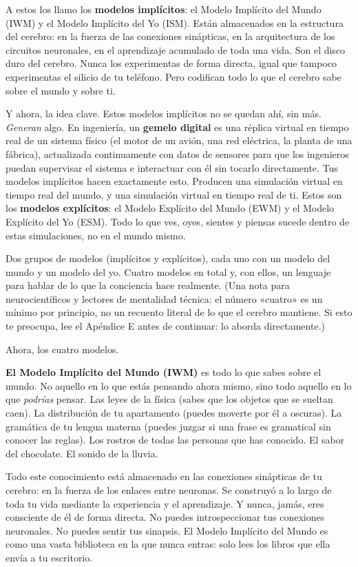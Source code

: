 \documentclass[11pt, twoside, openright]{book}
\begin{document}
A estos los llamo los \textbf{modelos implícitos}: el Modelo Implícito del Mundo (IWM) y el Modelo Implícito del Yo (ISM). Están almacenados en la estructura del cerebro: en la fuerza de las conexiones sinápticas, en la arquitectura de los circuitos neuronales, en el aprendizaje acumulado de toda una vida. Son el disco duro del cerebro. Nunca los experimentas de forma directa, igual que tampoco experimentas el silicio de tu teléfono. Pero codifican todo lo que el cerebro sabe sobre el mundo y sobre ti.

Y ahora, la idea clave. Estos modelos implícitos no se quedan ahí, sin más. \textit{Generan} algo. En ingeniería, un \textbf{gemelo digital} es una réplica virtual en tiempo real de un sistema físico (el motor de un avión, una red eléctrica, la planta de una fábrica), actualizada continuamente con datos de sensores para que los ingenieros puedan supervisar el sistema e interactuar con él sin tocarlo directamente. Tus modelos implícitos hacen exactamente esto. Producen una simulación virtual en tiempo real del mundo, y una simulación virtual en tiempo real de ti. Estos son los \textbf{modelos explícitos}: el Modelo Explícito del Mundo (EWM) y el Modelo Explícito del Yo (ESM). Todo lo que ves, oyes, sientes y piensas sucede dentro de estas simulaciones, no en el mundo mismo.

Dos grupos de modelos (implícitos y explícitos), cada uno con un modelo del mundo y un modelo del yo. Cuatro modelos en total y, con ellos, un lenguaje para hablar de lo que la conciencia hace realmente. (Una nota para neurocientíficos y lectores de mentalidad técnica: el número «cuatro» es un mínimo por principio, no un recuento literal de lo que el cerebro mantiene. Si esto te preocupa, lee el Apéndice E antes de continuar: lo aborda directamente.)

Ahora, los cuatro modelos.

\textbf{El Modelo Implícito del Mundo (IWM)} es todo lo que sabes sobre el mundo. No aquello en lo que estás pensando ahora mismo, sino todo aquello en lo que \textit{podrías} pensar. Las leyes de la física (sabes que los objetos que se sueltan caen). La distribución de tu apartamento (puedes moverte por él a oscuras). La gramática de tu lengua materna (puedes juzgar si una frase es gramatical sin conocer las reglas). Los rostros de todas las personas que has conocido. El sabor del chocolate. El sonido de la lluvia.

Todo este conocimiento está almacenado en las conexiones sinápticas de tu cerebro: en la fuerza de los enlaces entre neuronas. Se construyó a lo largo de toda tu vida mediante la experiencia y el aprendizaje. Y nunca, jamás, eres consciente de él de forma directa. No puedes introspeccionar tus conexiones neuronales. No puedes sentir tus sinapsis. El Modelo Implícito del Mundo es como una vasta biblioteca en la que nunca entras: solo lees los libros que ella envía a tu escritorio.
\end{document}
